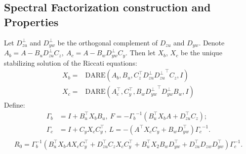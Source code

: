 \subsection{Spectral Factorization construction and Properties}
Let \(D_{zu}^\perp\) and \(D_{yw}^\perp\) be the orthogonal complement of \(D_{zu}\) and \(D_{yw}\). Denote \(A_b = A - B_u D_{zu}^\perp C_z,\ A_c = A -B_w D_{yw}^\perp C_y\). Then let \(X_b\), \(X_c\) be the unique stabilizing solution of the Riccati equations:
\begin{equation}\label{eqn::DAREH2optcont}
\begin{split}
X_b = &\mathrm{DARE}(A_b,B_u, C_z^\top {D_{zu}^\perp} {D_{zu}^\perp}^\top C_z,I)
\\
X_c = &\mathrm{DARE}(A_c^\top,C_y^\top, B_w {D_{yw}^\perp}^\top {D_{yw}^\perp} B_w,I)
\end{split}
\end{equation}
Define:
\begin{equation} \label{eqn::centralizedH2contParas}
\begin{split}
    \Gamma_b &=I +B_u^\top X_b B_u,\ F = -{\Gamma_b}^{-1}(B_u^\top X_b A + D_{zu}^\top C_{z});\\
    \Gamma_c & = I +C_y X_c C_y^\top,\ L = -(A^\top X_c C_y + B_w D_{yw}^\top) {\Gamma_c}^{-1}.\\
\end{split}
\end{equation}
\begin{equation}\label{eqn:YP_R0}
    R_0 = \Gamma_b^{-1}(B_u^\top X_b A X_c C_y^\top + D_{zu}^\top C_z X_c C_y^\top + B_u^\top X_2 B_w D_{yw}^\top +D_{zu}^\top D_{zw} D_{yw}^\top) \Gamma_c^{-1}.
\end{equation}

